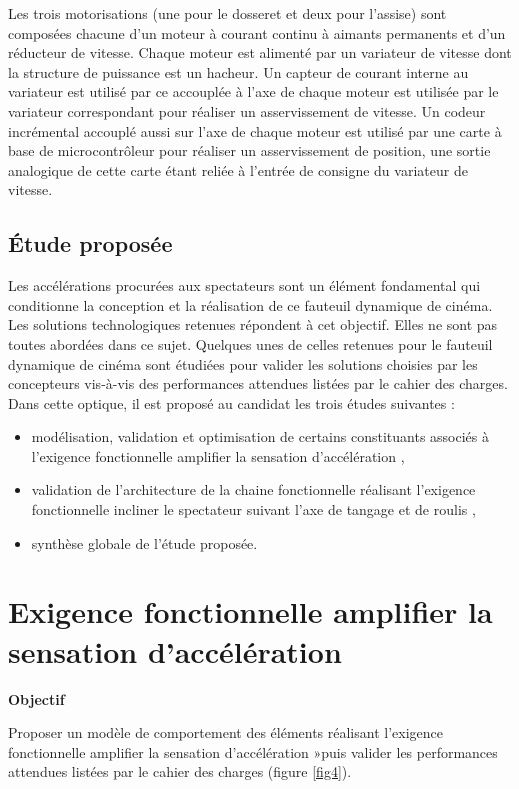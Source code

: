 Les trois motorisations (une pour le dosseret et deux pour l'assise) sont composées chacune d'un moteur à courant continu à aimants permanents et d'un réducteur de vitesse. Chaque moteur est alimenté par un variateur de vitesse dont la structure de puissance est un hacheur. Un capteur de courant interne au variateur est utilisé par ce accouplée à l'axe de chaque moteur est utilisée par le variateur correspondant pour réaliser un asservissement de vitesse. Un codeur incrémental accouplé aussi sur l'axe de chaque moteur est utilisé par une carte à base de microcontrôleur pour réaliser un asservissement de position, une sortie analogique de cette carte étant reliée à l'entrée de consigne du variateur de vitesse.

\subsection{Étude proposée}

Les accélérations procurées aux spectateurs sont un élément fondamental qui conditionne la conception et la réalisation de ce fauteuil dynamique de cinéma. Les solutions technologiques retenues répondent à cet objectif. Elles ne sont pas toutes abordées dans ce sujet. Quelques unes de celles retenues pour le fauteuil dynamique de cinéma sont étudiées pour valider les solutions choisies par les concepteurs vis-à-vis des performances attendues listées par le cahier des charges. Dans cette optique, il est proposé au candidat les trois études suivantes :
\begin{itemize}
 \item modélisation, validation et optimisation de certains constituants associés à l'exigence fonctionnelle \og amplifier la sensation d'accélération \fg,
 \item validation de l'architecture de la chaine fonctionnelle réalisant l'exigence fonctionnelle \og incliner le spectateur suivant l'axe de tangage et de roulis \fg,
 \item synthèse globale de l'étude proposée.
\end{itemize}

\section{Exigence fonctionnelle \og amplifier la sensation d'accélération \fg}

\textbf{Objectif}

Proposer un modèle de comportement des éléments réalisant l'exigence fonctionnelle \og amplifier la sensation d'accélération »\fg puis valider les performances attendues listées par le cahier des charges (figure \ref{fig4}).

